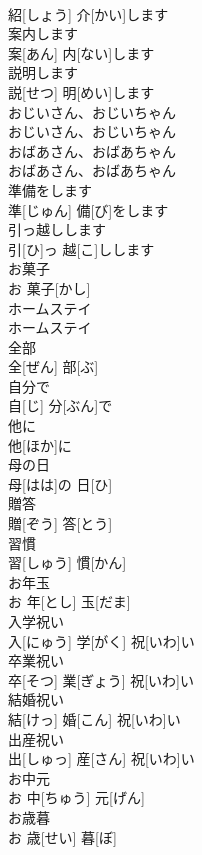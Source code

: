 \documentclass[8pt]{extreport}
\begin{document}
\begin{CJK}{UTF8}{min}
\\	紹[しょう] 介[かい]します		
\\	案内します	
\\	案[あん] 内[ない]します		
\\	説明します	
\\	説[せつ] 明[めい]します		
\\	おじいさん、おじいちゃん	
\\	おじいさん、おじいちゃん		
\\	おばあさん、おばあちゃん	
\\	おばあさん、おばあちゃん		
\\	準備をします	
\\	準[じゅん] 備[び]をします		
\\	引っ越しします	
\\	引[ひ]っ 越[こ]しします		
\\	お菓子	
\\	お 菓子[かし]		
\\	ホームステイ	
\\	ホームステイ		
\\	全部	
\\	全[ぜん] 部[ぶ]		
\\	自分で	
\\	自[じ] 分[ぶん]で		
\\	他に	
\\	他[ほか]に		
\\	母の日	
\\	母[はは]の 日[ひ]		
\\	贈答	
\\	贈[ぞう] 答[とう]		
\\	習慣	
\\	習[しゅう] 慣[かん]		
\\	お年玉	
\\	お 年[とし] 玉[だま]		
\\	入学祝い	
\\	入[にゅう] 学[がく] 祝[いわ]い		
\\	卒業祝い	
\\	卒[そつ] 業[ぎょう] 祝[いわ]い		
\\	結婚祝い	
\\	結[けっ] 婚[こん] 祝[いわ]い		
\\	出産祝い	
\\	出[しゅっ] 産[さん] 祝[いわ]い		
\\	お中元	
\\	お 中[ちゅう] 元[げん]		
\\	お歳暮	
\\	お 歳[せい] 暮[ぼ]		

\end{CJK}
\end{document}
